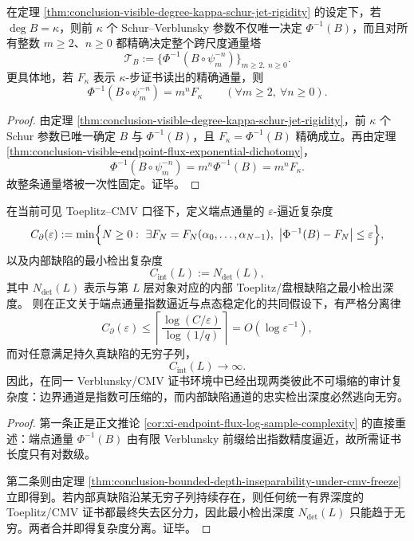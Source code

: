 \begin{corollary}\label{cor:conclusion-visible-renormalized-flux-tower-fixed-by-kappa-step-certificate}
在定理 \ref{thm:conclusion-visible-degree-kappa-schur-jet-rigidity} 的设定下，若 \(\deg B=\kappa\)，则前 \(\kappa\) 个 Schur--Verblunsky 参数不仅唯一决定 \(\Phi^{-1}(B)\)，而且对所有整数 \(m\ge 2\)、\(n\ge 0\) 都精确决定整个跨尺度通量塔
\[
\mathcal T_B:=\{\Phi^{-1}(B\circ\psi_m^{-n})\}_{m\ge 2,\ n\ge 0}.
\]
更具体地，若 \(F_\kappa\) 表示 \(\kappa\)-步证书读出的精确通量，则
\[
\Phi^{-1}(B\circ\psi_m^{-n})=m^nF_\kappa
\qquad (\forall m\ge 2,\ \forall n\ge 0).
\]
\end{corollary}
\begin{proof}
由定理 \ref{thm:conclusion-visible-degree-kappa-schur-jet-rigidity}，前 \(\kappa\) 个 Schur 参数已唯一确定 \(B\) 与 \(\Phi^{-1}(B)\)，且 \(F_\kappa=\Phi^{-1}(B)\) 精确成立。再由定理 \ref{thm:conclusion-visible-endpoint-flux-exponential-dichotomy}，
\[
\Phi^{-1}(B\circ\psi_m^{-n})=m^n\Phi^{-1}(B)=m^nF_\kappa.
\]
故整条通量塔被一次性固定。证毕。
\end{proof}

\begin{theorem}\label{thm:conclusion-visible-two-irreducible-audit-complexity-classes}
在当前可见 Toeplitz--CMV 口径下，定义端点通量的 \(\varepsilon\)-逼近复杂度
\[
C_{\partial}(\varepsilon)
:=
\min\Bigl\{
N\ge 0:\ \exists F_N=F_N(\alpha_0,\dots,\alpha_{N-1}),\
\bigl|\Phi^{-1}(B)-F_N\bigr|\le \varepsilon
\Bigr\},
\]
以及内部缺陷的最小检出复杂度
\[
C_{\mathrm{int}}(L):=N_{\det}(L),
\]
其中 \(N_{\det}(L)\) 表示与第 \(L\) 层对象对应的内部 Toeplitz/盘根缺陷之最小检出深度。
则在正文关于端点通量指数逼近与点态稳定化的共同假设下，有严格分离律
\[
C_{\partial}(\varepsilon)
\le
\left\lceil
\frac{\log(C/\varepsilon)}{\log(1/q)}
\right\rceil
=
O(\log \varepsilon^{-1}),
\]
而对任意满足持久真缺陷的无穷子列，
\[
C_{\mathrm{int}}(L)\to\infty.
\]
因此，在同一 Verblunsky/CMV 证书环境中已经出现两类彼此不可塌缩的审计复杂度：边界通道是指数可压缩的，而内部缺陷通道的忠实检出深度必然逃向无穷。
\end{theorem}
\begin{proof}
第一条正是正文推论 \ref{cor:xi-endpoint-flux-log-sample-complexity} 的直接重述：端点通量 \(\Phi^{-1}(B)\) 由有限 Verblunsky 前缀给出指数精度逼近，故所需证书长度只有对数级。

第二条则由定理 \ref{thm:conclusion-bounded-depth-inseparability-under-cmv-freeze} 立即得到。若内部真缺陷沿某无穷子列持续存在，则任何统一有界深度的 Toeplitz/CMV 证书都最终失去区分力，因此最小检出深度 \(N_{\det}(L)\) 只能趋于无穷。两者合并即得复杂度分离。证毕。
\end{proof}

